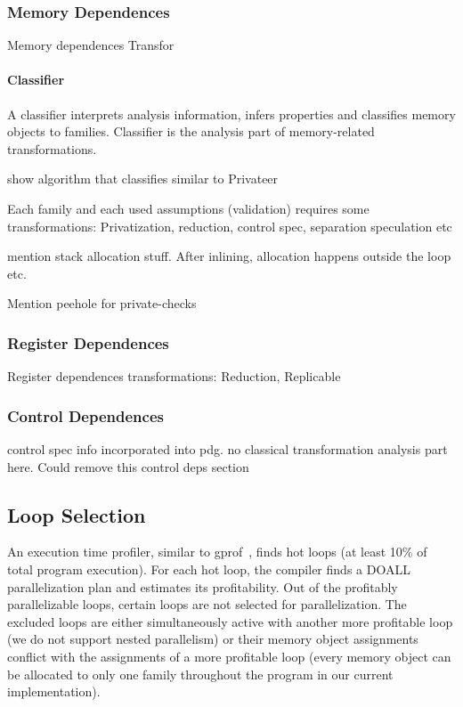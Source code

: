\subsubsection{Memory Dependences}

Memory dependences Transfor

\paragraph{Classifier}
A classifier interprets analysis information, infers properties and classifies memory objects to
families.
%
Classifier is the analysis part of memory-related transformations.

show algorithm that classifies similar to Privateer

Each family and each used assumptions (validation) requires some transformations:
Privatization, reduction, control spec, separation speculation etc


mention stack allocation stuff.
After inlining, allocation happens outside the loop etc.

Mention peehole for private-checks

\subsubsection{Register Dependences}

Register dependences transformations:
Reduction,
Replicable

\subsubsection{Control Dependences}

control spec info incorporated into pdg. no classical transformation analysis
part here. Could remove this control deps section

\subsection{Loop Selection} An execution time profiler, similar to
gprof~\cite{Privateer26}, finds hot loops (at least 10\% of total
program execution).
%
For each hot loop, the compiler finds a DOALL parallelization plan and
estimates its profitability.
%
Out of the profitably parallelizable loops, certain loops are not
selected for parallelization. The excluded loops are either
simultaneously active with another more profitable loop (we do not
support nested parallelism) or their memory object assignments
conflict with the assignments of a more profitable loop (every memory
object can be allocated to only one family throughout the program in
our current implementation).


